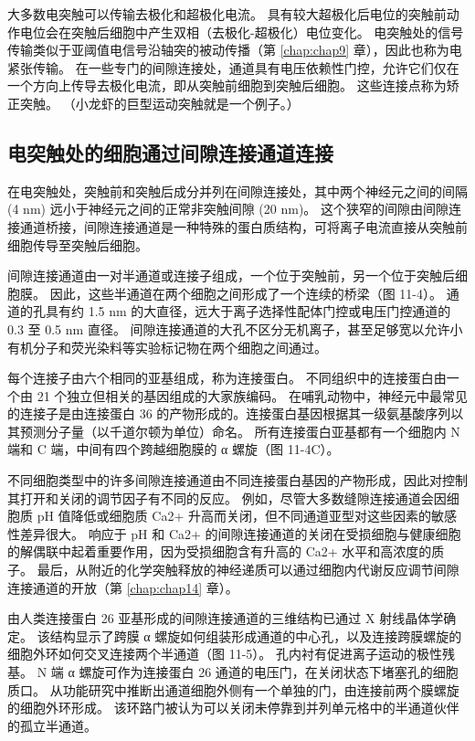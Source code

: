 大多数电突触可以传输去极化和超极化电流。 
具有较大超极化后电位的突触前动作电位会在突触后细胞中产生双相（去极化-超极化）电位变化。 
电突触处的信号传输类似于亚阈值电信号沿轴突的被动传播（第 \ref{chap:chap9} 章），因此也称为电紧张传输。 
在一些专门的间隙连接处，通道具有电压依赖性门控，允许它们仅在一个方向上传导去极化电流，即从突触前细胞到突触后细胞。 
这些连接点称为矫正突触。 （小龙虾的巨型运动突触就是一个例子。）


\subsection{电突触处的细胞通过间隙连接通道连接}
在电突触处，突触前和突触后成分并列在间隙连接处，其中两个神经元之间的间隔 (4 nm) 远小于神经元之间的正常非突触间隙 (20 nm)。 
这个狭窄的间隙由间隙连接通道桥接，间隙连接通道是一种特殊的蛋白质结构，可将离子电流直接从突触前细胞传导至突触后细胞。


间隙连接通道由一对半通道或连接子组成，一个位于突触前，另一个位于突触后细胞膜。 
因此，这些半通道在两个细胞之间形成了一个连续的桥梁（图 11-4）。 
通道的孔具有约 1.5 nm 的大直径，远大于离子选择性配体门控或电压门控通道的 0.3 至 0.5 nm 直径。 
间隙连接通道的大孔不区分无机离子，甚至足够宽以允许小有机分子和荧光染料等实验标记物在两个细胞之间通过。


每个连接子由六个相同的亚基组成，称为连接蛋白。 
不同组织中的连接蛋白由一个由 21 个独立但相关的基因组成的大家族编码。 
在哺乳动物中，神经元中最常见的连接子是由连接蛋白 36 的产物形成的。连接蛋白基因根据其一级氨基酸序列以其预测分子量（以千道尔顿为单位）命名。 
所有连接蛋白亚基都有一个细胞内 N 端和 C 端，中间有四个跨越细胞膜的 α 螺旋（图 11-4C）。


不同细胞类型中的许多间隙连接通道由不同连接蛋白基因的产物形成，因此对控制其打开和关闭的调节因子有不同的反应。 
例如，尽管大多数缝隙连接通道会因细胞质 pH 值降低或细胞质 Ca2+ 升高而关闭，但不同通道亚型对这些因素的敏感性差异很大。 
响应于 pH 和 Ca2+ 的间隙连接通道的关闭在受损细胞与健康细胞的解偶联中起着重要作用，因为受损细胞含有升高的 Ca2+ 水平和高浓度的质子。 
最后，从附近的化学突触释放的神经递质可以通过细胞内代谢反应调节间隙连接通道的开放（第 \ref{chap:chap14} 章）。


由人类连接蛋白 26 亚基形成的间隙连接通道的三维结构已通过 X 射线晶体学确定。 
该结构显示了跨膜 α 螺旋如何组装形成通道的中心孔，以及连接跨膜螺旋的细胞外环如何交叉连接两个半通道（图 11-5）。 
孔内衬有促进离子运动的极性残基。 
N 端 α 螺旋可作为连接蛋白 26 通道的电压门，在关闭状态下堵塞孔的细胞质口。 
从功能研究中推断出通道细胞外侧有一个单独的门，由连接前两个膜螺旋的细胞外环形成。 
该环路门被认为可以关闭未停靠到并列单元格中的半通道伙伴的孤立半通道。


